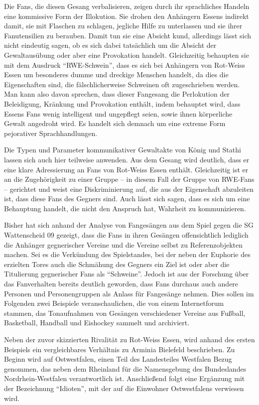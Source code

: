 Die Fans, die diesen Gesang verbalisieren, zeigen durch ihr sprachliches Handeln eine kommissive Form der Illokution.
Sie drohen den Anhängern Essens indirekt damit, sie mit Flaschen zu schlagen, jegliche Hilfe zu unterlassen und sie ihrer Fanutensilien zu berauben.
Damit tun sie eine Absicht kund, allerdings lässt sich nicht eindeutig sagen, ob es sich dabei tatsächlich um die Absicht der Gewaltausübung oder aber eine Provokation handelt.
Gleichzeitig behaupten sie mit dem Ausdruck "`RWE-Schwein"', dass es sich bei Anhängern von Rot-Weiss Essen um besonderes dumme und dreckige Menschen handelt, da dies die Eigenschaften sind, die fälschlicherweise Schweinen oft zugeschrieben werden.
Man kann also davon sprechen, dass dieser Fangesang die Perlokution der Beleidigung, Kränkung und Provokation enthält, indem behauptet wird, dass Essens Fans wenig intelligent und ungepflegt seien, sowie ihnen körperliche Gewalt angedroht wird.
Es handelt sich demnach um eine extreme Form pejorativer Sprachhandlungen.

Die Typen und Parameter kommunikativer Gewaltakte von König und Stathi\cite[S. 50]{EK10} lassen sich auch hier teilweise anwenden.
Aus dem Gesang wird deutlich, dass er eine klare Adressierung an Fans von Rot-Weiss Essen enthält.
Gleichzeitig ist er an die Zugehörigkeit zu einer Gruppe – in diesem Fall der Gruppe von RWE-Fans – gerichtet und weist eine Diskriminierung auf, die aus der Eigenschaft abzuleiten ist, dass diese Fans des Gegners sind.
Auch lässt sich sagen, dass es sich um eine Behauptung handelt, die nicht den Anspruch hat, Wahrheit zu kommunizieren.

Bisher hat sich anhand der Analyse von Fangesängen aus dem Spiel gegen die SG Wattenscheid 09 gezeigt, dass die Fans in ihren Gesängen offensichtlich lediglich die Anhänger gegnerischer Vereine und die Vereine selbst zu Referenzobjekten machen.
Sei es die Verkündung des Spielstandes, bei der neben der Euphorie des erzielten Tores auch die Schmähung des Gegners ein Ziel ist oder aber die Titulierung gegnerischer Fans als "`Schweine"'.
Jedoch ist aus der Forschung über das Fanverhalten bereits deutlich geworden, dass Fans durchaus auch andere Personen und Personengruppen als Anlass für Fangesänge nehmen.
Dies sollen im Folgenden zwei Beispiele veranschaulichen, die von einem Internetforum stammen, das Tonaufnahmen von Gesängen verschiedener Vereine aus Fußball, Basketball, Handball und Eishockey sammelt und archiviert\cite{BT14}.

Neben der zuvor skizzierten Rivalität zu Rot-Weiss Essen, wird anhand des ersten Beispiels ein vergleichbares Verhältnis zu Arminia Bielefeld beschrieben.
Zu Beginn wird auf Ostwestfalen, einen Teil des Landesteiles Westfalen Bezug genommen, das neben dem Rheinland für die Namensgebung des Bundeslandes Nordrhein-Westfalen verantwortlich ist.
Anschließend folgt eine Ergänzung mit der Bezeichnung "`Idioten"', mit der auf die Einwohner Ostwestfalens verwiesen wird.


